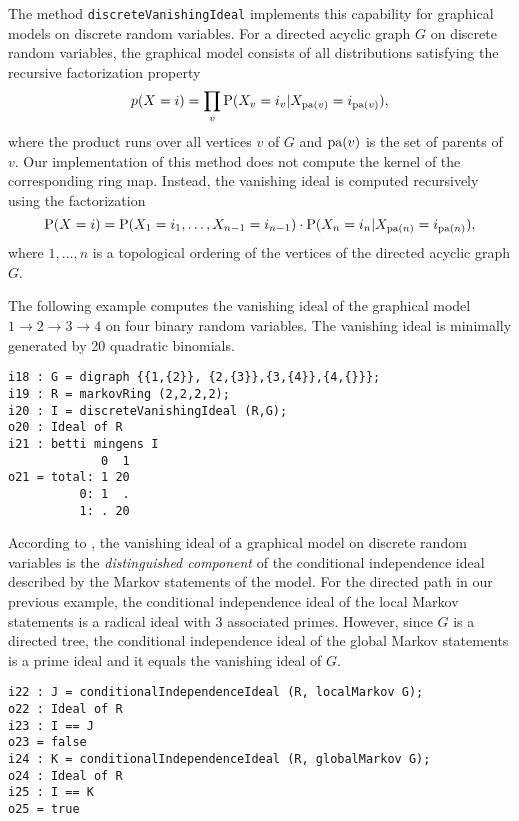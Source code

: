 \documentclass[letterpaper]{article}
\theoremstyle{plain}
\theoremstyle{definition}
\newcommand{\pa}{{\rm pa}}
\begin{document}
The method
{\tt discreteVanishingIdeal} implements this capability for graphical
models on discrete random variables. For a directed acyclic graph $G$ on discrete random variables, the graphical model consists
of all distributions satisfying the recursive factorization
property 
\[p(X = i) = \prod_{v} {\rm P}(X_{v} = i_{v} | X_{\pa(v)} = i_{\pa(v)}),\]
where the product runs over all vertices $v$ of $G$ and $\pa(v)$ is the set of
parents of $v$. 
Our implementation of this method does not compute the kernel of the
corresponding ring map. Instead, the vanishing ideal is
computed recursively using the factorization 
\[{\rm P}(X = i) = {\rm P}(X_{1} = i_{1},\dots, X_{n-1} = i_{n-1})\cdot {\rm P}(X_{n} = i_{n} | X_{\pa(n)} = i_{\pa(n)}),\]
where $1, \ldots, n$ is a topological ordering of
the vertices of the directed acyclic graph $G$.

The following example computes the vanishing ideal of the graphical model $1\to
2 \to 3\to 4$ on four binary random variables. The vanishing ideal is
minimally generated by 20 quadratic binomials.

\begin{verbatim}
i18 : G = digraph {{1,{2}}, {2,{3}},{3,{4}},{4,{}}};
i19 : R = markovRing (2,2,2,2);
i20 : I = discreteVanishingIdeal (R,G);
o20 : Ideal of R
i21 : betti mingens I
             0  1
o21 = total: 1 20
          0: 1  .
          1: . 20
\end{verbatim}

According to \cite{GSS}, the vanishing ideal of a graphical model on discrete
random variables is the \emph{distinguished
  component} of the conditional independence ideal described by the Markov
statements of the model. For the directed path in our previous example, the
conditional independence ideal of the local Markov statements 
is a radical ideal with 3 associated primes. However, since $G$ is a directed
tree, the conditional independence ideal of the global Markov statements is a
prime ideal and it equals the vanishing ideal of $G$.

 \begin{verbatim}
i22 : J = conditionalIndependenceIdeal (R, localMarkov G);
o22 : Ideal of R
i23 : I == J
o23 = false
i24 : K = conditionalIndependenceIdeal (R, globalMarkov G);
o24 : Ideal of R
i25 : I == K
o25 = true
\end{verbatim}
\end{document}
